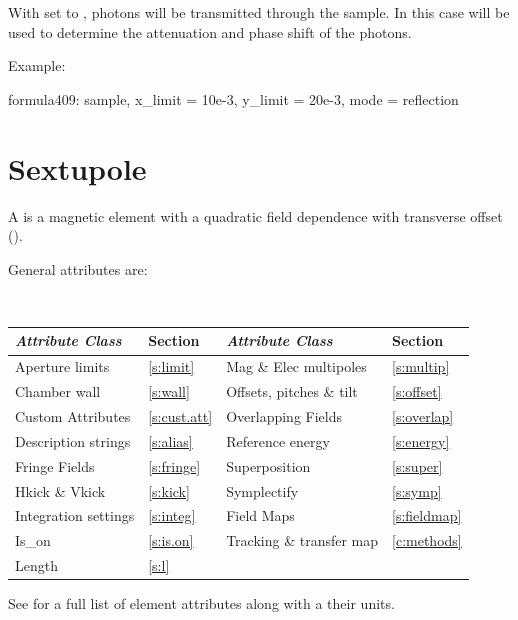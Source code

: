 {With  set to , photons will be transmitted
through the sample. In this case  will be used to
determine the attenuation and phase shift of the photons.

Example:
\begin{example}
  formula409: sample, x_limit = 10e-3, y_limit = 20e-3, mode = reflection
\end{example}

\newpage

\section{Sextupole}
\label{s:sex}

A  is a magnetic element with a quadratic field
dependence with transverse offset ().

General  attributes are:
\begin{center}
\tt
\begin{tabular}{llll} \toprule
  {\sl Attribute Class}      & Section           & {\sl Attribute Class}      & Section           \\ \midrule
  Aperture limits            & \ref{s:limit}     & Mag \& Elec multipoles     & \ref{s:multip}    \\
  Chamber wall               & \ref{s:wall}      & Offsets, pitches \& tilt   & \ref{s:offset}    \\
  Custom Attributes          & \ref{s:cust.att}  & Overlapping Fields         & \ref{s:overlap}   \\
  Description strings        & \ref{s:alias}     & Reference energy           & \ref{s:energy}    \\ 
  Fringe Fields              & \ref{s:fringe}    & Superposition              & \ref{s:super}     \\
  Hkick \& Vkick             & \ref{s:kick}      & Symplectify                & \ref{s:symp}      \\
  Integration settings       & \ref{s:integ}     & Field Maps                 & \ref{s:fieldmap}  \\
  Is_on                      & \ref{s:is.on}     & Tracking \& transfer map   & \ref{c:methods}   \\ 
  Length                     & \ref{s:l}         &                            &                   \\ 
  \bottomrule
\end{tabular}
\end{center}
\toffset
See  for a full list of element attributes along with a their units.

}
